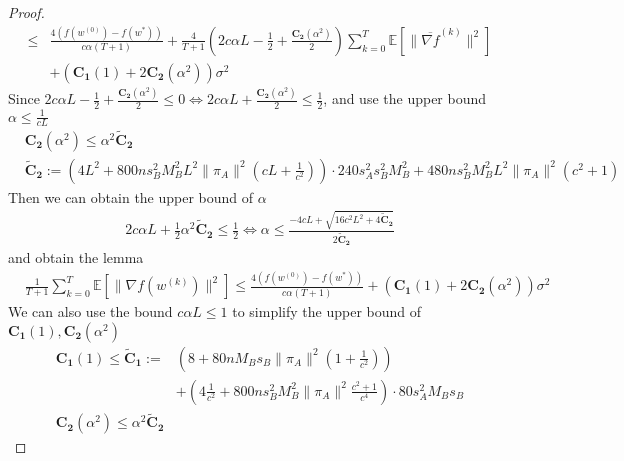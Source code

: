 \documentclass{article}
\newcommand{\EE}[1]{\mathbb{E}\left[#1\right]}
\newcommand{\norm}[1]{\| #1 \|}
\begin{document}
\begin{proof}
\begin{align*}
  \leq & \frac{4(f(w^{(0)})-f(w^{*}))}{c\alpha(T+1)}+\frac{4}{T+1}\left(2c\alpha L-\frac{1}{2}+\frac{\mathbf{C_2}(\alpha^2)}{2}\right)\sum_{k=0}^T\EE{\norm{\overline{\nabla f}^{(k)}}^2}\\&+\left(\mathbf{C_1}(1)+2\mathbf{C_2}(\alpha^2)\right)\sigma^2
  \end{align*}
  Since $2c\alpha L-\frac{1}{2}+\frac{\mathbf{C_2}(\alpha^2)}{2}\leq 0 \iff 2c\alpha L+\frac{\mathbf{C_2}(\alpha^2)}{2}\leq \frac{1}{2}$, and use the upper bound $\alpha\leq \frac{1}{cL}$
  \begin{align*}
   &\mathbf{C_2}(\alpha^2)\leq \alpha^2\mathbf{\tilde{C}_2}\\
    &\mathbf{\tilde{C}_2}:=\left(4L^2+800ns_B^2M_B^2L^2\norm{\pi_A}^2(cL+\frac{1}{c^2})\right)\cdot 240s_A^2s_B^2M_B^2+480ns_B^2M_B^2L^2\norm{\pi_A}^2(c^2+1)
  \end{align*}
  Then we can obtain the upper bound of $\alpha$
  \begin{align*}
      2c\alpha L+\frac{1}{2}\alpha^2\mathbf{\tilde{C}_2} \leq \frac{1}{2}
      \iff  \alpha \leq \frac{-4cL+\sqrt{16c^2L^2+4\mathbf{\tilde{C}_2}}}{2\mathbf{\tilde{C}_2}}
  \end{align*}
  and obtain the lemma
   \begin{align*}
    &\frac{1}{T+1}\sum_{k=0}^T\EE{\norm{\nabla f(w^{(k)})}^2}\leq  \frac{4(f(w^{(0)})-f(w^{*}))}{c\alpha(T+1)}+\left(\mathbf{C_1}(1)+2\mathbf{C_2}(\alpha^2)\right)\sigma^2
  \end{align*}
  We can also use the bound $c\alpha L\leq 1$ to simplify the upper bound of $\mathbf{C_1}(1),\mathbf{C_2}(\alpha^2)$
  \begin{align*}
\mathbf{C_1}(1)\leq \mathbf{\tilde{C}_1}:=&\left(8+80nM_Bs_B\norm{\pi_A}^2(1 +\frac{1}{c^2})\right)\\&+\left(4\frac{1}{c^2}+800ns_B^2M_B^2\norm{\pi_A}^2\frac{c^2+1}{c^4}\right)\cdot 80s_A^2M_Bs_B\\
\mathbf{C_2}(\alpha^2)\leq \alpha^2\mathbf{\tilde{C}_2}&
  \end{align*}
\end{proof}
\end{document}
